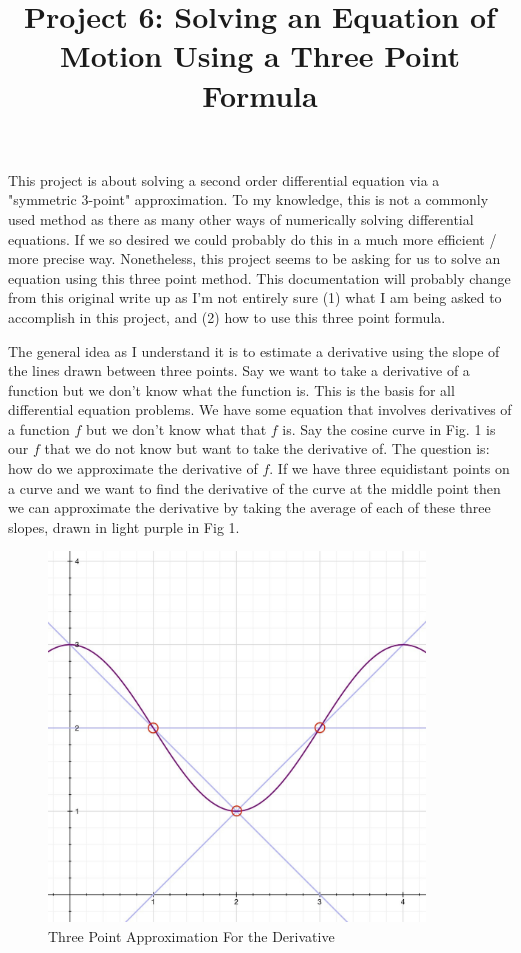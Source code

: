 \documentclass[11pt]{amsart}
\title{Project 6: Solving an Equation of Motion Using a Three Point Formula}
\begin{document}
\maketitle

This project is about solving a second order differential equation via a "symmetric 3-point" approximation.  To my knowledge, this is not a commonly used method as there as many other ways of numerically solving differential equations.  If we so desired we could probably do this in a much more efficient / more precise way.  Nonetheless, this project seems to be asking for us to solve an equation using this three point method.  This documentation will probably change from this original write up as I'm not entirely sure  (1) what I am being asked to accomplish in this project, and (2) how to use this three point formula.
\newline

The general idea as I understand it is to estimate a derivative using the slope of the lines drawn between three points.  Say we want to take a derivative of a function but we don't know what the function is.  This is the basis for all differential equation problems.  We have some equation that involves derivatives of a function $f$ but we don't know what that $f$ is.  Say the cosine curve in Fig. 1 is our $f$ that we do not know but want to take the derivative of.  The question is: how do we approximate the derivative of $f$.  If we have three equidistant points on a curve and we want to find the derivative of the curve at the middle point then we can approximate the derivative by taking the average of each of these three slopes, drawn in light purple in Fig 1.
\newline

\begin{figure}[ht!]
\centering
\includegraphics[width=100mm]{threepointapprox.jpg}
\caption{Three Point Approximation For the Derivative}
\label{overflow}
\end{figure}
\end{document}
